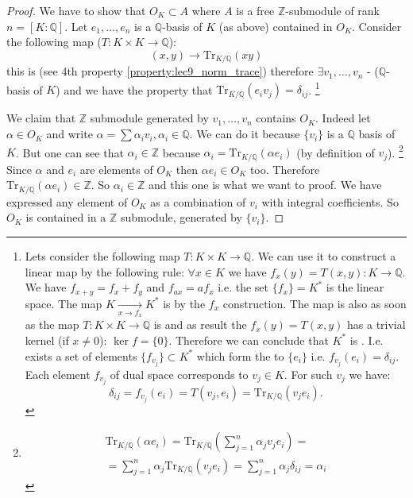 \begin{theorem}
\begin{proof}
    We have to show that $O_K \subset A$ where $A$ is a free
    $\mathbb{Z}$-submodule of rank $n = \left[K:\mathbb{Q}\right]$.
    Let $e_1, \dots, e_n$ is a $\mathbb{Q}$-basis of $K$ (as above)
    contained in $O_K$. Consider the following map
    ($T: K \times K \to \mathbb{Q}$):
    \[
    (x,y) \to \mathrm{Tr}_{K/\mathbb{Q}}\left(xy\right) 
    \]
    this is
     (see 4th property
    \ref{property:lec9_norm_trace}) therefore $\exists v_1, \dots,
    v_n$ -  ($\mathbb{Q}$-basis of $K$)
    and we have the property that
    $\mathrm{Tr}_{K/\mathbb{Q}}\left(e_i v_j\right) = \delta_{ij}$.
    \footnote{
      Lets consider the following map $T: K \times K \to
      \mathbb{Q}$. We can use it to construct a linear map by the
      following rule: $\forall x \in K$ we have $f_x(y) =
      T(x,y): K \to \mathbb{Q}$.
      We have $f_{x+y} = f_x + f_y$ and $f_{ax} = a f_x$
      i.e. the set $\{f_x\} = K^\ast$ is the linear space.
      The map $K \xrightarrow[x \to f_x]{} K^\ast$ is
       by the $f_x$ construction. The map is
      also  as soon as the map $T: K \times K \to \mathbb{Q}$ is
       and as result the $f_x(y) =
      T(x,y)$ has a trivial kernel (if $x \ne 0$): $\ker f =
      \{0\}$. Therefore we can conclude that $K^\ast$ is
      . I.e. exists a set of elements 
      $\{f_{v_j}\} \subset K^\ast$  which
      form the  to $\{e_i\}$ i.e. $f_{v_j}(e_i) =
      \delta_{ij}$. Each element $f_{v_j}$ of dual space corresponds
      to $v_j \in K$. For such $v_j$ we have:
      \[
      \delta_{ij} = f_{v_j}(e_i) = T(v_j, e_i) =
      \mathrm{Tr}_{K/\mathbb{Q}}\left(v_j e_i\right).
      \]
    }

    We claim that $\mathbb{Z}$ submodule generated by $v_1, \dots,
    v_n$ contains $O_K$. Indeed let $\alpha \in O_K$ and write
    \(
    \alpha = \sum \alpha_i v_i, \alpha_i \in \mathbb{Q}
    \). We can do it because $\{v_i\}$ is a $\mathbb{Q}$ basis of
    $K$. But one can see that $\alpha_i \in \mathbb{Z}$ because
    $\alpha_i = \mathrm{Tr}_{K/\mathbb{Q}}\left(\alpha e_i\right)$ (by
    definition of $v_j$).
    \footnote{
      \begin{eqnarray}
        \mathrm{Tr}_{K/\mathbb{Q}}\left(\alpha e_i\right) =
        \mathrm{Tr}_{K/\mathbb{Q}}\left(\sum_{j=1}^n\alpha_j v_j
        e_i\right) =
        \nonumber \\
        = \sum_{j=1}^n\alpha_j
        \mathrm{Tr}_{K/\mathbb{Q}}\left( v_j
        e_i\right) = 
        \sum_{j=1}^n\alpha_j \delta_{ij} = \alpha_i
        \nonumber
      \end{eqnarray}
    }
    Since $\alpha$ and $e_i$ are elements of
    $O_K$ then $\alpha e_i \in O_K$ too. Therefore
    $\mathrm{Tr}_{K/\mathbb{Q}}\left(\alpha e_i\right) \in
    \mathbb{Z}$. So $\alpha_i \in \mathbb{Z}$ and this one is what we
    want to proof. We have expressed any element of $O_K$ as a
    combination of $v_i$ with integral coefficients. So $O_K$ is contained
    in a $\mathbb{Z}$ submodule, generated by $\{v_i\}$.  
  \end{proof}
\end{theorem}

